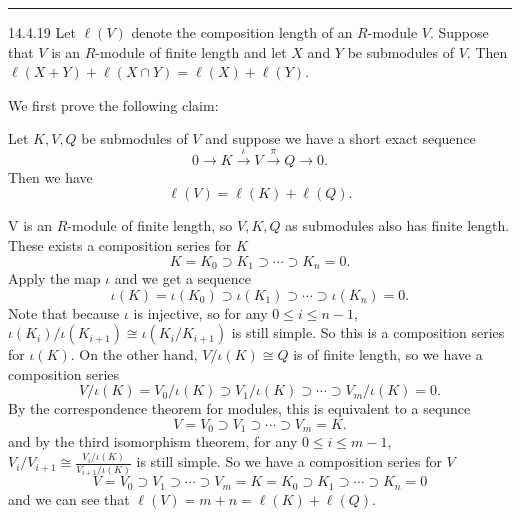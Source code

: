 \documentclass[a4paper, 12pt]{article}
\begin{document}
\noindent\rule{7in}{2.8pt}
\newpage 
\begin{problem}{14.4.19}
Let \(\ell(V)\) denote the composition length of an \(R\)-module \(V\). Suppose that \(V\) is an \(R\)-module of finite length and let \(X\) and \(Y\) be submodules of \(V\). Then 
\(\ell(X+Y)+\ell(X\cap Y)=\ell(X)+\ell(Y)\).
\end{problem}
\begin{solution}
We first prove the following claim:
\begin{claim}
Let \(K,V,Q\) be submodules of \(V\) and suppose we have a short exact sequence 
\[0\rightarrow K\xrightarrow{\iota} V\xrightarrow{\pi} Q\rightarrow 0.\]
Then we have 
\[\ell(V)=\ell(K)+\ell(Q).\]
\end{claim}
\begin{claimproof}
V is an \(R\)-module of finite length, so \(V,K,Q\) as submodules also has finite length. These exists a composition series for \(K\) 
\[K=K_0\supset K_1\supset \cdots\supset K_n=0.\]
Apply the map \(\iota\) and we get a sequence 
\[\iota(K)=\iota(K_0)\supset \iota(K_1)\supset \cdots\supset \iota(K_n)=0.\]
Note that because \(\iota\) is injective, so for any \(0\leq i\leq n-1\), \(\iota(K_i)/\iota(K_{i+1})\cong \iota(K_i/K_{i+1})\) is still simple. So this is a 
composition series for \(\iota(K)\). On the other hand, \(V/\iota(K)\cong Q\) is of finite length, so we have a composition series 
\[V/\iota(K)=V_0/\iota(K)\supset V_1/\iota(K)\supset \cdots\supset V_m/\iota(K)=0.\]
By the correspondence theorem for modules, this is equivalent to a sequnce 
\[V=V_0\supset V_1\supset \cdots\supset V_m=K.\]
and by the third isomorphism theorem, for any \(0\leq i\leq m-1\), \(V_i/V_{i+1}\cong \frac{V_i/\iota(K)}{V_{i+1}/\iota(K)}\) is still simple. So we have a composition series for \(V\) 
\[V=V_0\supset V_1\supset \cdots\supset V_m=K=K_0\supset K_1\supset \cdots\supset K_n=0\]
and we can see that \(\ell(V)=m+n=\ell(K)+\ell(Q)\).
\end{claimproof}


\end{solution}
\end{document}
